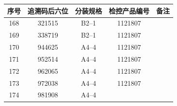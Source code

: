 \documentclass[UTF8,10pt,a4paper,fontset=fandol]{ctexart}
\newcommand{\fieldvalue}[1]{#1}
\begin{document}
\begin{tabularx}{\textwidth}{|c|c|c|c|X|}
\hline
序号 & 追溯码后六位 & 分装规格 & 检控产品编号 & 备注\\
\hline
\fieldvalue{168} &
\fieldvalue{321515} &
\fieldvalue{B2--1} &
\fieldvalue{1121807} & \\ \hline
\fieldvalue{169} &
\fieldvalue{338719} &
\fieldvalue{B2--1} &
\fieldvalue{1121807} & \\ \hline
\fieldvalue{170} &
\fieldvalue{944625} &
\fieldvalue{A4--4} &
\fieldvalue{1121807} & \\ \hline
\fieldvalue{171} &
\fieldvalue{952514} &
\fieldvalue{A4--4} &
\fieldvalue{1121807} & \\ \hline
\fieldvalue{172} &
\fieldvalue{962065} &
\fieldvalue{A4--4} &
\fieldvalue{1121807} & \\ \hline
\fieldvalue{173} &
\fieldvalue{972038} &
\fieldvalue{A4--4} &
\fieldvalue{1121807} & \\ \hline
\fieldvalue{174} &
\fieldvalue{981908} &
\fieldvalue{A4--4} &

\end{tabularx}
\end{document}
